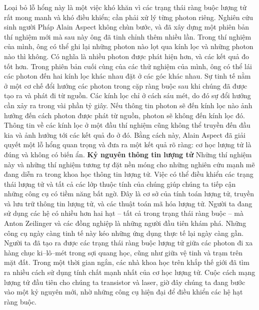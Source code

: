 \begin{multicols}{2}
	Loại bỏ lỗ hổng này là một việc khó khăn vì các trạng thái ràng buộc lượng tử rất mong manh và khó điều khiển; cần phải xử lý từng photon riêng. Nghiên cứu sinh người Pháp Alain Aspect không chùn bước, và đã xây dựng một phiên bản thí nghiệm mới mà sau này ông đã tinh chỉnh thêm nhiều lần. Trong thí nghiệm của mình, ông có thể ghi lại những photon nào lọt qua kính lọc và những photon nào thì không. Có nghĩa là nhiều photon được phát hiện hơn, và các kết quả đo tốt hơn.
	\vskip 0.1cm
	Trong phiên bản cuối cùng của các thử nghiệm của mình, ông có thể lái các photon đến hai kính lọc khác nhau đặt ở các góc khác nhau. Sự tinh tế nằm ở một cơ chế đổi hướng các photon trong cặp ràng buộc sau khi chúng đã được tạo ra và phát đi từ nguồn. Các kính lọc chỉ ở cách sáu mét, do đó sự đổi hướng cần xảy ra trong vài phần tỷ giây. Nếu thông tin photon sẽ đến kính lọc nào ảnh hưởng đến cách photon được phát từ nguồn, photon sẽ không đến kính lọc đó. Thông tin về các kính lọc ở một đầu thí nghiệm cũng không thể truyền đến đầu kia và ảnh hưởng tới các kết quả đo ở đó.
	\vskip 0.1cm
	Bằng cách này, Alain Aspect đã giải quyết một lỗ hổng quan trọng và đưa ra một kết quả rõ ràng: cơ học lượng tử là đúng và không có biến ẩn.
	\vskip 0.1cm
	\textbf{\color{timhieukhoahoc}Kỷ nguyên thông tin lượng tử}
	\vskip 0.1cm
	Những thí nghiệm này và những thí nghiệm tương tự đặt nền móng cho những nghiên cứu mạnh mẽ đang diễn ra trong khoa học thông tin lượng tử.
	\vskip 0.1cm
	Việc có thể điều khiển các trạng thái lượng tử và tất cả các lớp thuộc tính của chúng giúp chúng ta tiếp cận những công cụ có tiềm năng bất ngờ. Đây là cơ sở của tính toán lượng tử, truyền và lưu trữ thông tin lượng tử, và các thuật toán mã hóa lượng tử. Người ta đang sử dụng các hệ có nhiều hơn hai hạt -- tất cả trong trạng thái ràng buộc -- mà Anton Zeilinger và các đồng nghiệp là những người đầu tiên khám phá.
	\vskip 0.1cm
	Những công cụ ngày càng tinh tế này kéo những ứng dụng thực tế lại ngày càng gần. Người ta đã tạo ra được các trạng thái ràng buộc lượng tử giữa các photon đi xa hàng chục ki--lô--mét trong sợi quang học, cũng như giữa vệ tinh và trạm trên mặt đất. Trong một thời gian ngắn, các nhà khoa học trên khắp thế giới đã tìm ra nhiều cách sử dụng tính chất mạnh nhất của cơ học lượng tử.
	\vskip 0.1cm
	Cuộc cách mạng lượng tử đầu tiên cho chúng ta transistor và laser, giờ đây chúng ta đang bước vào một kỷ nguyên mới, nhờ những công cụ hiện đại để điều khiển các hệ hạt ràng buộc.
	\vskip 0.1cm
	\begin{figure}[H]
		\vspace*{-5pt}

\end{figure}
\end{multicols}
